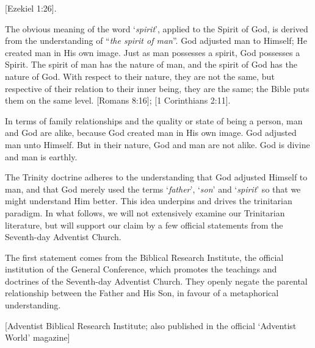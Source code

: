 [Ezekiel 1:26].

The obvious meaning of the word ‘\textit{spirit}’, applied to the Spirit of God, is derived from the understanding of “\textit{the spirit of man}”. God adjusted man to Himself; He created man in His own image. Just as man possesses a spirit, God possesses a Spirit. The spirit of man has the nature of man, and the spirit of God has the nature of God. With respect to their nature, they are not the same, but respective of their relation to their inner being, they are the same; the Bible puts them on the same level. [Romans 8:16]; [1 Corinthians 2:11].

In terms of family relationships and the quality or state of being a person, man and God are alike, because God created man in His own image. God adjusted man unto Himself. But in their nature, God and man are not alike. God is divine and man is earthly.

The Trinity doctrine adheres to the understanding that God adjusted Himself to man, and that God merely used the terms ‘\textit{father}’, ‘\textit{son}’ and ‘\textit{spirit}’ so that we might understand Him better. This idea underpins and drives the trinitarian paradigm. In what follows, we will not extensively examine our Trinitarian literature, but will support our claim by a few official statements from the Seventh-day Adventist Church. 

The first statement comes from the Biblical Research Institute, the official institution of the General Conference, which promotes the teachings and doctrines of the Seventh-day Adventist Church. They openly negate the parental relationship between the Father and His Son, in favour of a metaphorical understanding.

[Adventist Biblical Research Institute; also published in the official ‘Adventist World’ magazine]

